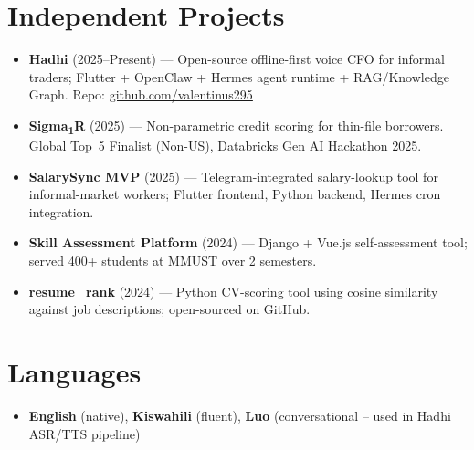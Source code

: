 \documentclass[11pt,a4paper,sans]{moderncv}
\begin{document}

\section{Independent Projects}
\vspace{1pt}
\begin{itemize}

\item \textbf{Hadhi} (2025--Present) --- Open-source offline-first voice CFO for informal traders; Flutter + OpenClaw + Hermes agent runtime + RAG/Knowledge Graph. Repo: \href{https://github.com/valentinus295}{github.com/valentinus295}

\item \textbf{Sigma\textsubscript{1}R} (2025) --- Non-parametric credit scoring for thin-file borrowers. Global Top~5 Finalist (Non-US), Databricks Gen AI Hackathon 2025.

\item \textbf{SalarySync MVP} (2025) --- Telegram-integrated salary-lookup tool for informal-market workers; Flutter frontend, Python backend, Hermes cron integration.

\item \textbf{Skill Assessment Platform} (2024) --- Django + Vue.js self-assessment tool; served 400+ students at MMUST over 2 semesters.

\item \textbf{resume\_rank} (2024) --- Python CV-scoring tool using cosine similarity against job descriptions; open-sourced on GitHub.

\end{itemize}


\section{Languages}
\vspace{1pt}
\begin{itemize}
 \item \textbf{English} (native), \textbf{Kiswahili} (fluent), \textbf{Luo} (conversational -- used in Hadhi ASR/TTS pipeline)
\end{itemize}
\end{document}
